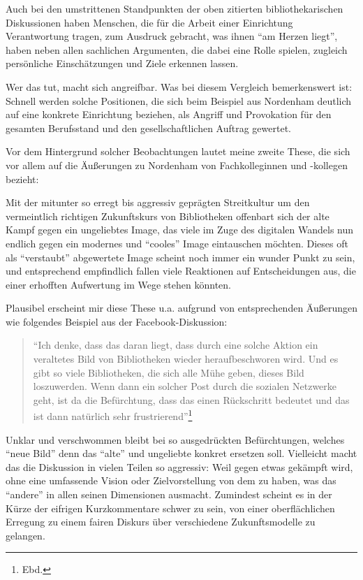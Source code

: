 \documentclass[a4paper,
fontsize=11pt,
oneside,
numbers=noperiodatend,
parskip=half-,
bibliography=totoc,
final
]{scrartcl}
\begin{document}
Auch bei den umstrittenen Standpunkten der oben zitierten
bibliothekarischen Diskussionen haben Menschen, die für die Arbeit einer
Einrichtung Verantwortung tragen, zum Ausdruck gebracht, was ihnen
\enquote{am Herzen liegt}, haben neben allen sachlichen Argumenten, die
dabei eine Rolle spielen, zugleich persönliche Einschätzungen und Ziele
erkennen lassen.

Wer das tut, macht sich angreifbar. Was bei diesem Vergleich
bemerkenswert ist: Schnell werden solche Positionen, die sich beim
Beispiel aus Nordenham deutlich auf eine konkrete Einrichtung beziehen,
als Angriff und Provokation für den gesamten Berufsstand und den
gesellschaftlichen Auftrag gewertet.

Vor dem Hintergrund solcher Beobachtungen lautet meine zweite These, die
sich vor allem auf die Äußerungen zu Nordenham von Fachkolleginnen und
-kollegen bezieht:

Mit der mitunter so erregt bis aggressiv geprägten Streitkultur um den
vermeintlich richtigen Zukunftskurs von Bibliotheken offenbart sich der
alte Kampf gegen ein ungeliebtes Image, das viele im Zuge des digitalen
Wandels nun endlich gegen ein modernes und \enquote{cooles} Image
eintauschen möchten. Dieses oft als \enquote{verstaubt} abgewertete
Image scheint noch immer ein wunder Punkt zu sein, und entsprechend
empfindlich fallen viele Reaktionen auf Entscheidungen aus, die einer
erhofften Aufwertung im Wege stehen könnten.

Plausibel erscheint mir diese These u.a. aufgrund von entsprechenden
Äußerungen wie folgendes Beispiel aus der Facebook-Diskussion:

\begin{quote}
\enquote{Ich denke, dass das daran liegt, dass durch eine solche Aktion
ein veraltetes Bild von Bibliotheken wieder heraufbeschworen wird. Und
es gibt so viele Bibliotheken, die sich alle Mühe geben, dieses Bild
loszuwerden. Wenn dann ein solcher Post durch die sozialen Netzwerke
geht, ist da die Befürchtung, dass das einen Rückschritt bedeutet und
das ist dann natürlich sehr frustrierend}\footnote{Ebd.}
\end{quote}

Unklar und verschwommen bleibt bei so ausgedrückten Befürchtungen,
welches \enquote{neue Bild} denn das \enquote{alte} und ungeliebte
konkret ersetzen soll. Vielleicht macht das die Diskussion in vielen
Teilen so aggressiv: Weil gegen etwas gekämpft wird, ohne eine
umfassende Vision oder Zielvorstellung von dem zu haben, was das
\enquote{andere} in allen seinen Dimensionen ausmacht. Zumindest scheint
es in der Kürze der eifrigen Kurzkommentare schwer zu sein, von einer
oberflächlichen Erregung zu einem fairen Diskurs über verschiedene
Zukunftsmodelle zu gelangen.
\end{document}
